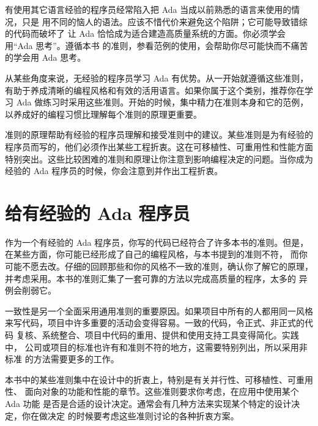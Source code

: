 有使用其它语言经验的程序员经常陷入把 Ada 当成以前熟悉的语言来使用的情况，只是
用不同的恼人的语法。应该不惜代价来避免这个陷阱；它可能导致错综的代码而破坏了
让 Ada 恰恰成为适合建造高质量系统的方面。你必须学会用``Ada 思考''。遵循本书
的准则，参看范例的使用，会帮助你尽可能快而不痛苦的学会用 Ada 思考。 

从某些角度来说，无经验的程序员学习 Ada 有优势。从一开始就遵循这些准则，
有助于养成清晰的编程风格和有效的活用语言。如果你属于这个类别，推荐你在学习
Ada 做练习时采用这些准则。开始的时候，集中精力在准则本身和它的范例，
以养成好的编程习惯比理解每个准则的原理更重要。

准则的原理帮助有经验的程序员理解和接受准则中的建议。某些准则是为有经验的
程序员而写的，他们必须作出某些工程折衷。这在可移植性、可重用性和性能方面
特别突出。这些比较困难的准则和原理让你注意到影响编程决定的问题。当你成为
经验的 Ada 程序员的时候，你会注意到并作出工程折衷。

\section{给有经验的 Ada 程序员}
作为一个有经验的 Ada 程序员，你写的代码已经符合了许多本书的准则。但是，
在某些方面，你可能已经形成了自己的编程风格，与本书提到的准则不符，
而你可能不愿去改。仔细的回顾那些和你的风格不一致的准则，确认你了解它的原理，
并考虑采用。本书的准则汇集了一套可靠的方法以完成高质量的程序，太多的
异例会削弱它。

一致性是另一个全面采用通用准则的重要原因。如果项目中所有的人都用同一风格
来写代码，项目中许多重要的活动会变得容易。一致的代码，令正式、非正式的代码
复核、系统整合、项目中代码的重用、提供和使用支持工具变得简化。实践中，
公司或项目的标准也许有和准则不符的地方，这需要特别列出，所以采用非标准
的方法需要更多的工作。

本书中的某些准则集中在设计中的折衷上，特别是有关并行性、可移植性、可重用性、
面向对象的功能和性能的章节。这些准则要求你考虑，在应用中使用某个 Ada 功能
是否是合适的设计决定。通常会有几种方法来实现某个特定的设计决定，你在做决定
的时候要考虑这些准则讨论的各种折衷方案。

